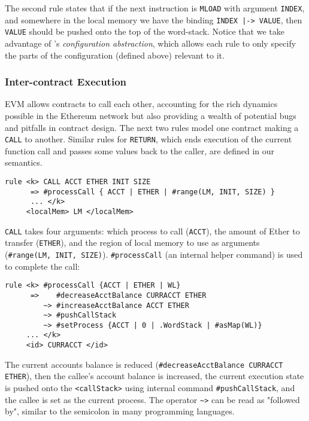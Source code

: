 The second rule states that if the next instruction is \texttt{MLOAD} with argument
\texttt{INDEX}, and somewhere in the local memory we
have the binding \texttt{INDEX |-> VALUE}, then \texttt{VALUE} should be
pushed onto the top of the word-stack. Notice that we take advantage of \K{}'s
\textit{configuration abstraction}, which allows each rule to only specify the
parts of the configuration (defined above) relevant to it.

\subsubsection{Inter-contract Execution}

EVM allows contracts to call each other, accounting for the rich dynamics
possible in the Ethereum network but also providing a wealth of potential bugs
and pitfalls in contract design. The next two rules model one contract making a
\texttt{CALL} to another. Similar rules for \texttt{RETURN}, which ends
execution of the current function call and passes some values back to the
caller, are defined in our semantics.

\begin{verbatim}
rule <k> CALL ACCT ETHER INIT SIZE
      => #processCall { ACCT | ETHER | #range(LM, INIT, SIZE) }
      ... </k>
     <localMem> LM </localMem>
\end{verbatim}

\texttt{CALL} takes four arguments: which process
to call (\texttt{ACCT}), the amount of Ether to transfer (\texttt{ETHER}), and
the region of local memory to use as arguments (\texttt{\#range(LM, INIT,
SIZE)}). \texttt{\#processCall} (an internal helper command) is used to complete
the call:

\begin{verbatim}
rule <k> #processCall {ACCT | ETHER | WL}
      =>    #decreaseAcctBalance CURRACCT ETHER
         ~> #increaseAcctBalance ACCT ETHER
         ~> #pushCallStack
         ~> #setProcess {ACCT | 0 | .WordStack | #asMap(WL)}
     ... </k>
     <id> CURRACCT </id>
\end{verbatim}

The current accounts balance is reduced (\texttt{\#decreaseAcctBalance CURRACCT
ETHER}), then the callee's account balance is increased, the current execution
state is pushed onto the \texttt{<callStack>} using internal command
\texttt{\#pushCallStack}, and the callee is set as the current process. The
operator \texttt{\textasciitilde >} can be read as "followed by", similar to the semicolon in many programming languages.
